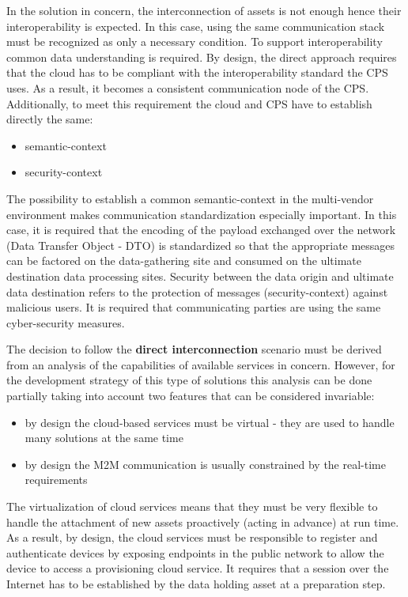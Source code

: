 \documentclass{article}
\begin{document}
In the solution in concern, the interconnection of assets is not enough  hence their interoperability is expected. In this case, using the same communication stack must be recognized as only a necessary condition. To support interoperability common data understanding is required. By design, the direct approach requires that the cloud has to be compliant with the interoperability standard the CPS uses. As a result, it becomes a consistent communication node of the CPS. Additionally, to meet this requirement the cloud and CPS have to establish directly the same:

\begin{itemize}
      \item semantic-context
      \item security-context
\end{itemize}

The possibility to establish a common semantic-context in the multi-vendor environment makes communication standardization especially important. In this case, it is required that the encoding of the payload exchanged over the network (Data Transfer Object - DTO) is standardized so that the appropriate messages can be factored on the data-gathering site and consumed on the ultimate destination data processing sites. Security between the data origin and ultimate data destination refers to the protection of messages (security-context) against malicious users. It is required that communicating parties are using the same cyber-security measures.

The decision to follow the \textbf{direct interconnection} scenario must be derived from an analysis of the capabilities of available services in concern. However, for the development strategy of this type of solutions this analysis can be done partially taking into account two features that can be considered invariable:

\begin{itemize}
      \item by design the cloud-based services must be virtual - they are used to handle many solutions at the same time
      \item by design the M2M communication is usually constrained by the real-time requirements
\end{itemize}

The virtualization of cloud services means that they must be very flexible to handle the attachment of new assets proactively (acting in advance) at run time. As a result, by design, the cloud services must be responsible to register and authenticate devices by exposing endpoints in the public network to allow the device to access a provisioning cloud service. It requires that a session over the Internet has to be established by the data holding asset at a preparation step.
\end{document}
